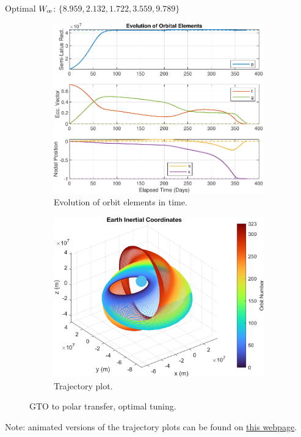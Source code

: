Optimal $W_{\moe}$: $\{8.959, 2.132, 1.722, 3.559, 9.789\}$

\begin{figure}[H]
    \centering
    \begin{subfigure}[t]{0.49\textwidth}
        \includegraphics[width=\textwidth]{figures/oguri_optim/orbital_elements.pdf}
        \caption{Evolution of orbit elements in time.}
        \label{fig:oguri_optim_a}
    \end{subfigure}
    \begin{subfigure}[t]{0.49\textwidth}
        \includegraphics[width=\textwidth]{figures/oguri_optim/trajectory_plot.png}
        \caption{Trajectory plot.}
        \label{fig:oguri_optim_b}
    \end{subfigure}
    \caption{GTO to polar transfer, optimal tuning.}
    \label{fig:oguri_optim}
\end{figure}

{
\Large
Note: animated versions of the trajectory plots can be found on \href{https://github.com/itchono/SLyGA/wiki/Case-Outputs}{this webpage}.
}